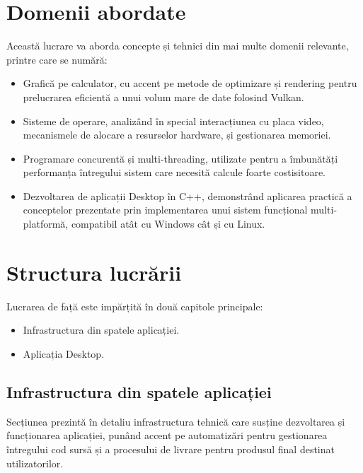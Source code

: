 \section{Domenii abordate}
Această lucrare va aborda concepte și tehnici din mai multe domenii relevante, printre care se numără:
\begin{itemize}
    \item Grafică pe calculator, cu accent pe metode de optimizare și rendering pentru prelucrarea eficientă a unui volum mare de date folosind Vulkan.
    \item Sisteme de operare, analizând în special interacțiunea cu placa video, mecanismele de alocare a resurselor hardware, și gestionarea memoriei.
    \item Programare concurentă și multi-threading, utilizate pentru a îmbunătăți performanța întregului sistem care necesită calcule foarte costisitoare.
    \item Dezvoltarea de aplicații Desktop în C++, demonstrând aplicarea practică a conceptelor prezentate prin implementarea unui sistem funcțional multi-platformă, compatibil atât cu Windows cât și cu Linux.
\end{itemize}

\section{Structura lucrării}
Lucrarea de față este impărțită în două capitole principale:
\begin{itemize}
    \item Infrastructura din spatele aplicației.
    \item Aplicația Desktop.
\end{itemize}

    \subsection{Infrastructura din spatele aplicației}
    Secțiunea prezintă în detaliu infrastructura tehnică care susține dezvoltarea și funcționarea aplicației, punând accent pe automatizări pentru gestionarea întregului cod sursă și a procesului de livrare pentru produsul final destinat utilizatorilor. 
    
